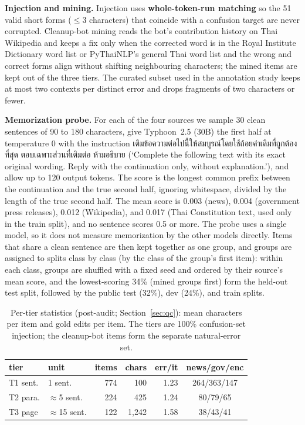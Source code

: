 \documentclass[11pt]{article}
\begin{document}
\textbf{Injection and mining.} Injection uses \textbf{whole-token-run matching} so the 51 valid
short forms ($\le 3$ characters) that coincide with a confusion target are never corrupted.
Cleanup-bot mining reads the bot's contribution history on Thai Wikipedia and keeps a fix only
when the corrected word is in the Royal Institute Dictionary word list or PyThaiNLP's general
Thai word list and the wrong and correct forms align without shifting neighbouring characters; the mined items are kept out of the three
tiers. The curated subset used in the annotation study keeps at most two contexts per distinct
error and drops fragments of two characters or fewer.

\textbf{Memorization probe.} For each of the four sources we sample 30 clean sentences of 90 to
180 characters, give Typhoon~2.5 (30B) the first half at temperature 0 with the instruction
เติมข้อความต่อไปนี้ให้สมบูรณ์โดยใช้ถ้อยคำเดิมที่ถูกต้องที่สุด ตอบเฉพาะส่วนที่เติมต่อ ห้ามอธิบาย
(`Complete the following text with its exact original wording. Reply with the continuation only,
without explanation.'), and allow up to 120 output tokens. The score is the longest common prefix
between the continuation and the true second half, ignoring whitespace, divided by the length of
the true second half. The mean score is 0.003 (news), 0.004 (government press releases), 0.012
(Wikipedia), and 0.017 (Thai Constitution text, used only in the train split), and no sentence
scores 0.5 or more. The probe uses a single model, so it does not measure memorization by the
other models directly. Items that share a clean sentence are then kept together as one group,
and groups are assigned to splits class by class (by the class of the group's first item): within
each class, groups are shuffled with a fixed seed and ordered by their source's mean score, and
the lowest-scoring 34\% (mined groups first) form the held-out test split, followed by the public
test (32\%), dev (24\%), and train splits.

\begin{table}[t]
\centering\small\setlength{\tabcolsep}{4pt}
\begin{tabular}{@{}llrrrc@{}}
\toprule
tier & unit & items & chars & err/it & news/gov/enc \\
\midrule
T1 sent.  & 1 sent.          & 774 & 100     & 1.23 & 264/363/147 \\
T2 para.  & $\approx$5 sent.  & 224 & 425     & 1.24 & 80/79/65 \\
T3 page   & $\approx$15 sent. & 122 & 1{,}242 & 1.58 & 38/43/41 \\
\bottomrule
\end{tabular}
\caption{Per-tier statistics (post-audit; Section~\ref{sec:qc}): mean characters per item and
gold edits per item. The tiers are 100\% confusion-set injection; the cleanup-bot items form the
separate natural-error set.}
\label{tab:tiers}
\end{table}
\end{document}
